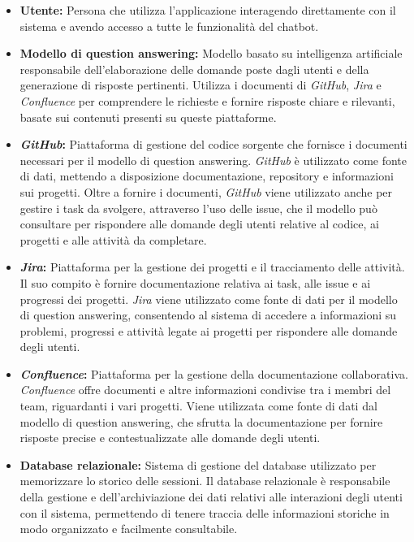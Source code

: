 \begin{itemize}
    \item \textbf{Utente:} Persona che utilizza l'applicazione interagendo direttamente con il sistema e avendo accesso a tutte le funzionalità del chatbot.
    \item \textbf{Modello di question answering:} Modello basato su intelligenza artificiale responsabile dell'elaborazione delle domande poste dagli utenti e della generazione di risposte pertinenti. Utilizza i documenti di \emph{GitHub}, \emph{Jira} e \emph{Confluence} per comprendere le richieste e fornire risposte chiare e rilevanti, basate sui contenuti presenti su queste piattaforme.
    \item \textbf{\emph{GitHub}:} Piattaforma di gestione del codice sorgente che fornisce i documenti necessari per il modello di question answering. \emph{GitHub} è utilizzato come fonte di dati, mettendo a disposizione documentazione, repository e informazioni sui progetti. Oltre a fornire i documenti, \emph{GitHub} viene utilizzato anche per gestire i task da svolgere, attraverso l'uso delle issue, che il modello può consultare per rispondere alle domande degli utenti relative al codice, ai progetti e alle attività da completare.
    \item \textbf{\emph{Jira}:} Piattaforma per la gestione dei progetti e il tracciamento delle attività. Il suo compito è fornire documentazione relativa ai task, alle issue e ai progressi dei progetti. \emph{Jira} viene utilizzato come fonte di dati per il modello di question answering, consentendo al sistema di accedere a informazioni su problemi, progressi e attività legate ai progetti per rispondere alle domande degli utenti.
    \item \textbf{\emph{Confluence}:} Piattaforma per la gestione della documentazione collaborativa. \emph{Confluence } offre documenti e altre informazioni condivise tra i membri del team, riguardanti i vari progetti. Viene utilizzata come fonte di dati dal modello di question answering, che sfrutta la documentazione per fornire risposte precise e contestualizzate alle domande degli utenti.
    \item \textbf{Database relazionale:} Sistema di gestione del database utilizzato per memorizzare lo storico delle sessioni. Il database relazionale è responsabile della gestione e dell'archiviazione dei dati relativi alle interazioni degli utenti con il sistema, permettendo di tenere traccia delle informazioni storiche in modo organizzato e facilmente consultabile.
\end{itemize}



